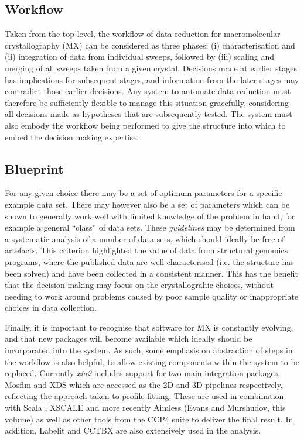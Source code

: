\documentclass[preprint,pdf]{iucr}
\begin{document}
\subsection{Workflow}

Taken from the top level, the workflow of data reduction for
macromolecular crystallography (MX) can be considered as three phases:
(i) characterisation and (ii) integration of data from individual sweeps,
followed by (iii) scaling and merging of all sweeps taken from a given
crystal. Decisions made at earlier stages has implications for
subsequent stages, and information from the later stages may
contradict those earlier decisions. Any system to automate data
reduction must therefore be sufficiently flexible to manage this
situation gracefully, considering all decisions made as hypotheses
that are subsequently tested. The system must also embody the workflow being
performed to give the structure into which to embed the decision
making expertise.

\subsection{Blueprint}

For any given choice there may be a set of optimum parameters for a
specific example data set. There may however also be a set of
parameters which can be 
shown to generally work well with limited knowledge of the problem in
hand, for example a general ``class'' of data sets.
These \emph{guidelines} may be determined from a systematic
analysis of a number of data sets, which should ideally be free of
artefacts. This criterion highlighted the value of data from 
structural genomics programs, where the published data are well
characterised (i.e. the structure has been solved) and have been
collected in a consistent manner. This has the benefit that the
decision making may focus on the crystallograhic choices, without
needing to work around problems caused by poor sample quality or
inappropriate choices in data collection. 

Finally, it is important to recognise that software for MX is
constantly evolving, and that new packages will become available which
ideally should be incorporated into the system. As such, some emphasis
on abstraction of steps in the workflow is also helpful, to allow
existing components within the system to be replaced. Currently \emph{xia2} 
includes support for two main integration packages, Mosflm
\cite{leslie1992rcm} and XDS \cite{Kabsch:dz5179}
which are accessed as the 2D and 3D
pipelines respectively, reflecting the approach taken to profile
fitting. These are used in combination with Scala \cite{Evans:ba5084}, XSCALE
and more recently Aimless (Evans and Murshudov, this volume) as well
as other
tools from the CCP4 suite to deliver the final result. In
addition, Labelit \cite{Sauter:dd5008} and CCTBX
\cite{Grosse-Kunstleve:ks0118} are also 
extensively used in the analysis.
\end{document}
